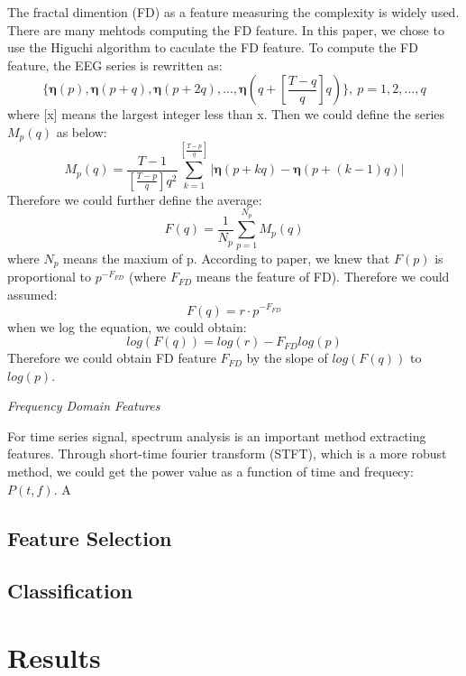 \documentclass[runningheads,a4paper]{llncs}
\begin{document}
The fractal dimention (FD) as a feature measuring the complexity is widely used.
There are many mehtods computing the FD feature. In this paper, we chose to use
the Higuchi algorithm\cite{FD} to caculate the FD feature. To compute the FD
feature, the EEG series is rewritten as:
\begin{equation}
    \{{\bm{\eta}}(p), {\bm{\eta}}(p+q), {\bm{\eta}}(p+2q), ... , {\bm{\eta}}(q+[\frac{T-q}{q}]q)\},\ p = 1,2,...,q
\end{equation}
where [x] means the largest integer less than x. Then we could define the series $M_p(q)$ as below:
\begin{equation}
  M_p(q) = \frac{T-1}{[\frac{T-p}{q}]q^2}\sum_{k=1}^{[\frac{T-p}{q}]}|{\bm{\eta}}(p+kq) - {\bm{\eta}}(p+(k-1)q)|
\end{equation}
 Therefore we could further define the average:
\begin{equation}
  F(q) = \frac{1}{N_p}\sum_{p=1}^{N_p}M_p(q)
\end{equation}
where $N_p$ means the maxium of p.
According to paper\cite{FD}, we knew that $F(p)$ is proportional to $p^{-F_{FD}}$
(where $F_{FD}$ means the feature of FD). Therefore we could assumed:
\begin{equation}
   F(q) = r\cdot{p^{-F_{FD}}}
\end{equation}
when we log the equation, we could obtain:
\begin{equation}
  log(F(q)) = log(r) - {F_{FD}}log(p)
\end{equation}
Therefore we could obtain FD feature $F_{FD}$ by the slope of $log(F(q))$ to $log(p)$.

\emph{Frequency Domain Features}

For time series signal, spectrum analysis is an important method extracting features.
Through short-time fourier transform (STFT)\cite{STFT}, which is a more robust method,
we could get the power value as a function of time and frequecy: $P(t,f)$.
A
\subsection{Feature Selection}
\subsection{Classification}

\section{Results}
\end{document}
